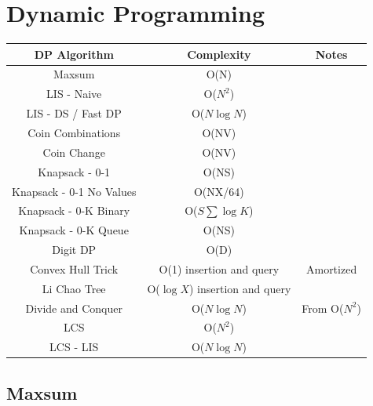 \documentclass{article}
\begin{document}
\section{Dynamic Programming}
\begin{table}[H]
\begin{tabular}{|c|c|c|}
\hline
DP Algorithm             & Complexity                      & Notes         \\ \hline
Maxsum                   & O(N)                            &               \\ \hline
LIS - Naive              & O($N^2$)                        &               \\ \hline
LIS - DS / Fast DP       & O($N \log N$)                   &               \\ \hline
Coin Combinations        & O(NV)                           &               \\ \hline
Coin Change              & O(NV)                           &               \\ \hline
Knapsack - 0-1           & O(NS)                           &               \\ \hline
Knapsack - 0-1 No Values & O(NX/64)                        &               \\ \hline
Knapsack - 0-K Binary    & O($S\sum\log K$)                &               \\ \hline
Knapsack - 0-K Queue     & O(NS)                           &               \\ \hline
Digit DP                 & O(D)                            &               \\ \hline
Convex Hull Trick        & O(1) insertion and query        & Amortized     \\ \hline
Li Chao Tree             & O($\log X$) insertion and query &               \\ \hline
Divide and Conquer       & O($N \log N$)                   & From O($N^2$) \\ \hline
LCS                      & O($N^2$)                        &               \\ \hline
LCS - LIS                & O($N \log N$)                   &               \\ \hline
\end{tabular}
\end{table}

\subsection{Maxsum}
\end{document}
